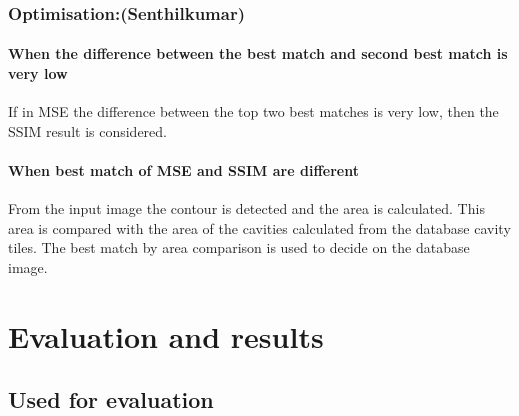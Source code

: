 \documentclass{article}
\begin{document}
\subsubsection*{Optimisation:(Senthilkumar)}


\paragraph*{When the difference between the best match and second best match is very low}

If in MSE the difference between the top two best matches is very low, then the SSIM result is considered.

\paragraph*{When best match of MSE and SSIM are different}

From the input image the contour is detected and the area is calculated. This area is compared with the area of the cavities calculated from the database cavity tiles. The best match by area comparison is used to decide on the database image.

\section{Evaluation and results}

\subsection{Used for evaluation}
\end{document}
